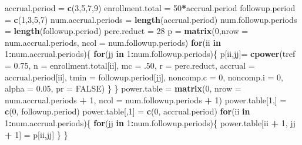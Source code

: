 \documentclass[ignorenonframetext,]{beamer}
\newenvironment{Shaded}{\begin{snugshade}}{\end{snugshade}}
\newcommand{\ControlFlowTok}[1]{\textcolor[rgb]{0.13,0.29,0.53}{\textbf{#1}}}
\newcommand{\DataTypeTok}[1]{\textcolor[rgb]{0.13,0.29,0.53}{#1}}
\newcommand{\DecValTok}[1]{\textcolor[rgb]{0.00,0.00,0.81}{#1}}
\newcommand{\FloatTok}[1]{\textcolor[rgb]{0.00,0.00,0.81}{#1}}
\newcommand{\KeywordTok}[1]{\textcolor[rgb]{0.13,0.29,0.53}{\textbf{#1}}}
\newcommand{\NormalTok}[1]{#1}
\newcommand{\OperatorTok}[1]{\textcolor[rgb]{0.81,0.36,0.00}{\textbf{#1}}}
\newcommand{\OtherTok}[1]{\textcolor[rgb]{0.56,0.35,0.01}{#1}}
\newcommand{\StringTok}[1]{\textcolor[rgb]{0.31,0.60,0.02}{#1}}
\begin{document}
\begin{frame}[fragile]

\scriptsize

\begin{Shaded}
\begin{Highlighting}[]
\NormalTok{accrual.period =}\StringTok{ }\KeywordTok{c}\NormalTok{(}\DecValTok{3}\NormalTok{,}\DecValTok{5}\NormalTok{,}\DecValTok{7}\NormalTok{,}\DecValTok{9}\NormalTok{)}
\NormalTok{enrollment.total =}\StringTok{ }\DecValTok{50}\OperatorTok{*}\NormalTok{accrual.period}
\NormalTok{followup.period =}\StringTok{ }\KeywordTok{c}\NormalTok{(}\DecValTok{1}\NormalTok{,}\DecValTok{3}\NormalTok{,}\DecValTok{5}\NormalTok{,}\DecValTok{7}\NormalTok{)}
\NormalTok{num.accrual.periods =}\StringTok{ }\KeywordTok{length}\NormalTok{(accrual.period)}
\NormalTok{num.followup.periods =}\StringTok{ }\KeywordTok{length}\NormalTok{(followup.period)}
\NormalTok{perc.reduct =}\StringTok{ }\DecValTok{28}
\NormalTok{p =}\StringTok{ }\KeywordTok{matrix}\NormalTok{(}\DecValTok{0}\NormalTok{,}\DataTypeTok{nrow =}\NormalTok{ num.accrual.periods, }\DataTypeTok{ncol =}\NormalTok{ num.followup.periods)}
\ControlFlowTok{for}\NormalTok{(ii }\ControlFlowTok{in} \DecValTok{1}\OperatorTok{:}\NormalTok{num.accrual.periods)\{}
   \ControlFlowTok{for}\NormalTok{(jj }\ControlFlowTok{in} \DecValTok{1}\OperatorTok{:}\NormalTok{num.followup.periods)\{}
\NormalTok{     p[ii,jj]=}\StringTok{ }\KeywordTok{cpower}\NormalTok{(}\DataTypeTok{tref =} \FloatTok{0.75}\NormalTok{, }\DataTypeTok{n =}\NormalTok{ enrollment.total[ii], }
                      \DataTypeTok{mc =} \FloatTok{.50}\NormalTok{, }\DataTypeTok{r =}\NormalTok{ perc.reduct, }
                      \DataTypeTok{accrual =}\NormalTok{ accrual.period[ii], }
                      \DataTypeTok{tmin =}\NormalTok{ followup.period[jj], }
                      \DataTypeTok{noncomp.c =} \DecValTok{0}\NormalTok{, }\DataTypeTok{noncomp.i =} \DecValTok{0}\NormalTok{, }
                      \DataTypeTok{alpha =} \FloatTok{0.05}\NormalTok{, }\DataTypeTok{pr =} \OtherTok{FALSE}\NormalTok{)}
\NormalTok{   \}}
\NormalTok{\}}
\NormalTok{power.table =}\StringTok{ }\KeywordTok{matrix}\NormalTok{(}\DecValTok{0}\NormalTok{, }\DataTypeTok{nrow =}\NormalTok{ num.accrual.periods }\OperatorTok{+}\StringTok{ }\DecValTok{1}\NormalTok{,}
                     \DataTypeTok{ncol =}\NormalTok{ num.followup.periods }\OperatorTok{+}\StringTok{ }\DecValTok{1}\NormalTok{)}
\NormalTok{power.table[}\DecValTok{1}\NormalTok{,] =}\StringTok{ }\KeywordTok{c}\NormalTok{(}\DecValTok{0}\NormalTok{, followup.period)}
\NormalTok{power.table[,}\DecValTok{1}\NormalTok{] =}\StringTok{ }\KeywordTok{c}\NormalTok{(}\DecValTok{0}\NormalTok{, accrual.period)}
\ControlFlowTok{for}\NormalTok{(ii }\ControlFlowTok{in} \DecValTok{1}\OperatorTok{:}\NormalTok{num.accrual.periods)\{}
  \ControlFlowTok{for}\NormalTok{(jj }\ControlFlowTok{in} \DecValTok{1}\OperatorTok{:}\NormalTok{num.followup.periods)\{}
\NormalTok{  power.table[ii }\OperatorTok{+}\StringTok{ }\DecValTok{1}\NormalTok{, jj }\OperatorTok{+}\StringTok{ }\DecValTok{1}\NormalTok{] =}\StringTok{ }\NormalTok{p[ii,jj]}
\NormalTok{  \}}
\NormalTok{\}}


\end{Highlighting}
\end{Shaded}
\end{frame}
\end{document}
